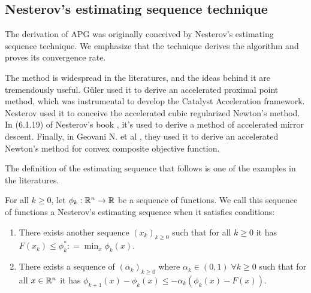 \documentclass[12pt]{article}
\begin{document}
    \subsection{Nesterov's estimating sequence technique}
        The derivation of APG was originally conceived by Nesterov's estimating sequence technique. 
        We emphasize that the technique derives the algorithm and proves its convergence rate. 
        \par
        The method is widespread in the literatures, and the ideas behind it are tremendously useful. 
        Güler \cite{guler_new_1992} used it to derive an accelerated proximal point method, which was instrumental to develop the Catalyst Acceleration framework. 
        Nesterov \cite{nesterov_accelerating_2008} used it to conceive the accelerated cubic regularized Newton's method. 
        In (6.1.19) of Nesterov's book \cite{nesterov_lectures_2018}, it's used to derive a method of accelerated mirror descent. 
        Finally, in Geovani N. et al \cite{grapiglia_accelerated_2019}, they used it to derive an accelerated Newton's method for convex composite objective function. 
        \par
        The definition of the estimating sequence that follows is one of the examples in the literatures. 
        \begin{definition}\label{def:nes-est-seq}
            For all $k \ge 0$, let $\phi_k : \mathbb R^n \rightarrow\mathbb R$ be a sequence of functions. 
            We call this sequence of functions a Nesterov's estimating sequence when it satisfies conditions: 
            \begin{enumerate}
                \item There exists another sequence $(x_k)_{k \ge 0}$ such that for all $k \ge 0$ it has $F(x_k) \le \phi_k^*: =\min_{x}\phi_k(x)$. 
                \item There exists a sequence of $(\alpha_k)_{k \ge 0}$ where $\alpha_k \in (0, 1)\; \forall k \ge0 $ such that for all $x \in \mathbb R^n$ it has $\phi_{k + 1}(x) - \phi_k(x) \le - \alpha_k(\phi_k(x) - F(x))$. 
            \end{enumerate}
        \end{definition}
\end{document}
